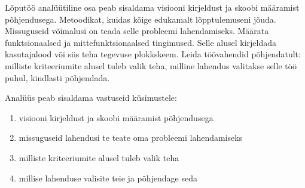 Lõputöö analüütiline osa peab sisaldama visiooni kirjeldust ja skoobi
määramist põhjendusega. Metoodikat, kuidas kõige edukamalt lõpptulemuseni
jõuda. Missuguseid võimalusi on teada selle probleemi lahendamiseks. Määrata
funktsionaalsed ja mittefunktsionaalsed tingimused. Selle alusel kirjeldada
kasutajalood või siis teha tegevuse plokkskeem. Leida töövahendid
põhjendatult: milliste kriteeriumite alusel tuleb valik teha, milline lahendus
valitakse selle töö puhul, kindlasti põhjendada.

Analüüs peab sisaldama vastuseid küsimustele:
\begin{enumerate}
    \item visiooni kirjeldust ja skoobi määramist põhjendusega
    \item missuguseid lahendusi te teate oma probleemi lahendamiseks
    \item milliste kriteeriumite alusel tuleb valik teha
    \item millise lahenduse valisite teie ja põhjendage seda
\end{enumerate}


